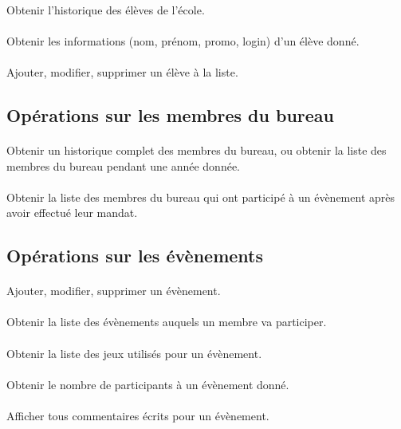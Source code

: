 \documentclass[a4paper, 11pt]{article}
\begin{document}
\paragraph{}
Obtenir l'historique des élèves de l'école.
\paragraph{}
Obtenir les informations (nom, prénom, promo, login) d'un élève donné.
\paragraph{}
Ajouter, modifier, supprimer un élève à la liste.
\subsection{Opérations sur les membres du bureau}
\paragraph{}
Obtenir un historique complet des membres du bureau, ou obtenir la liste des membres du bureau pendant une année donnée.
\paragraph{}
Obtenir la liste des membres du bureau qui ont participé à un évènement après avoir effectué leur mandat.
\subsection{Opérations sur les évènements}
\paragraph{}
Ajouter, modifier, supprimer un évènement.
\paragraph{}
Obtenir la liste des évènements auquels un membre va participer.
\paragraph{}
Obtenir la liste des jeux utilisés pour un évènement.
\paragraph{}
Obtenir le nombre de participants à un évènement donné.
\paragraph{}
Afficher tous commentaires écrits pour un évènement.
\end{document}
